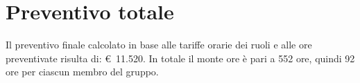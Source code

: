 \section{Preventivo totale}

Il preventivo finale calcolato in base alle tariffe orarie dei ruoli e alle ore preventivate risulta di: \euro~11.520.
In totale il monte ore è pari a 552 ore, quindi 92 ore per ciascun membro del gruppo.
